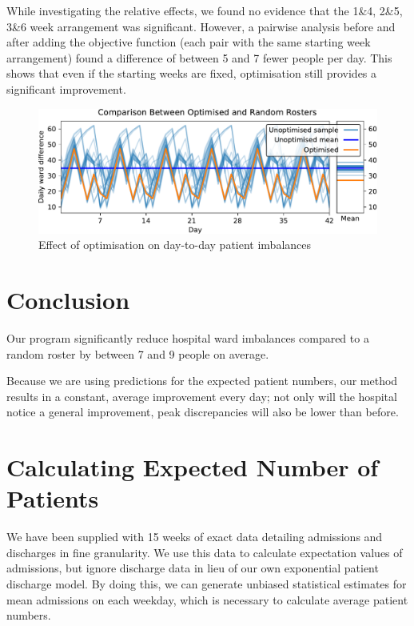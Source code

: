 \documentclass[a4paper]{article}
\begin{document}
While investigating the relative effects, we found no evidence that the 1\&4, 2\&5, 3\&6 week arrangement was significant. However, a pairwise analysis before and after adding the objective function (each pair with the same starting week arrangement) found a difference of between 5 and 7 fewer people per day. This shows that even if the starting weeks are fixed, optimisation still provides a significant improvement.

\begin{figure}[h]
    \centering\includegraphics[width=\linewidth]{../results/comparison}
    \caption{Effect of optimisation on day-to-day patient imbalances}
    \label{fig:comparison}
\end{figure}

\section{Conclusion}

Our program significantly reduce hospital ward imbalances compared to a random roster by between 7 and 9 people on average.

Because we are using predictions for the expected patient numbers, our method results in a constant, average improvement every day; not only will the hospital notice a general improvement, peak discrepancies will also be lower than before.

\newpage
\appendix
\iffalse
\section{Calculating Expected Number of Patients}

We have been supplied with 15 weeks of exact data detailing admissions and discharges in fine granularity. We use this data to calculate expectation values of admissions, but ignore discharge data in lieu of our own exponential patient discharge model. By doing this, we can generate unbiased statistical estimates for mean admissions on each weekday, which is necessary to calculate average patient numbers.
\end{document}
